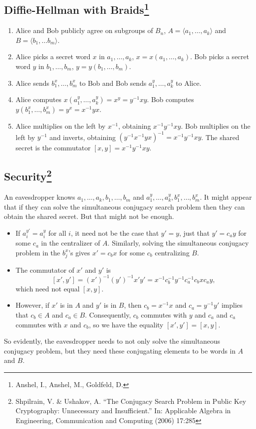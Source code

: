 \documentclass[11pt]{article}
\begin{document}
\subsection*{Diffie-Hellman with Braids\footnote{Anshel, I., Anshel, M., Goldfeld, D.}}
\begin{enumerate}
	\item Alice and Bob publicly agree on subgroups of $B_n$,  $A = \langle a_1, \ldots, a_k\rangle$ and $B = \langle b_1, \ldots b_m\rangle$.
	\item Alice picks a secret word $x$ in $a_1, \ldots, a_k$, $x = x(a_1, \ldots, a_k)$. Bob picks a secret word $y$ in $b_1, \ldots, b_m$, $y = y(b_1, \ldots, b_m)$.
	\item Alice sends $b_1^x, \ldots, b_m^x$ to Bob and Bob sends $a_1^y, \ldots, a_k^y$ to Alice.
	\item Alice computes $x(a_1^y, \ldots, a_k^y) = x^y = y^{-1}xy$. Bob computes $y(b_1^x, \ldots, b_m^x) = y^x = x^{-1}yx$.
	\item Alice multiplies on the left by $x^{-1}$, obtaining $x^{-1}y^{-1}xy$. Bob multiplies on the left by $y^{-1}$ and inverts, obtaining $(y^{-1}x^{-1}yx)^{-1} = x^{-1}y^{-1}xy$. The shared secret is the commutator $[x,y] = x^{-1}y^{-1}xy$.
\end{enumerate}

\subsection*{Security\footnote{Shpilrain, V. \& Ushakov, A. ``The Conjugacy Search Problem in Public Key Cryptography: Unnecessary and Insufficient.'' In: Applicable Algebra in Engineering, Communication and Computing (2006) 17:285}}
An eavesdropper knows $a_1, \ldots, a_k, b_1, \ldots, b_m$ and $a_1^y, \ldots, a_k^y, b_1^x, \ldots, b_m^x$. It might appear that if they can solve the simultaneous conjugacy search problem then they can obtain the shared secret. But that might not be enough.
\begin{itemize}
	\item If $a_i^{y'} = a_i^y$ for all $i$, it need not be the case that $y' = y$, just that $y' = c_ay$ for some $c_a$ in the centralizer of $A$. Similarly, solving the simultaneous conjugacy problem in the $b_j^x$'s gives $x' = c_bx$ for some $c_b$ centralizing $B$.
	\item The commutator of $x'$ and $y'$ is
	\[
	[x',y'] = (x')^{-1}(y')^{-1}x'y' = x^{-1}c_b^{-1}y^{-1}c_a^{-1}c_bxc_ay,
	\]
	which need not equal $[x,y]$.
	\item However, if $x'$ is in $A$ and $y'$ is in $B$, then $c_b = x^{-1}x$ and $c_a = y^{-1}y'$ implies that $c_b \in A$ and $c_a\in B$. Consequently, $c_b$ commutes with $y$ and $c_a$ and $c_a$ commutes with $x$ and $c_b$, so we have the equality $[x',y'] = [x,y]$.
\end{itemize}
So evidently, the eavesdropper needs to not only solve the simultaneous conjugacy problem, but they need these conjugating elements to be words in $A$ and $B$.
\end{document}
